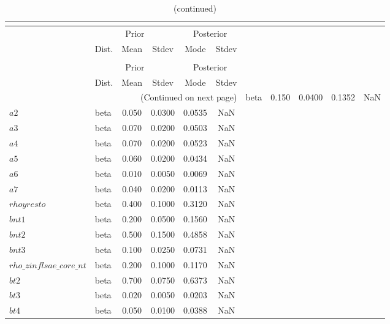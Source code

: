  
\begin{center}
\begin{longtable}{llcccc} 
\caption{Results from posterior maximization (parameters)}\\
 \label{Table:Posterior:1}\\
\toprule 
  & \multicolumn{3}{c}{Prior}  &  \multicolumn{2}{c}{Posterior} \\
  \cmidrule(r{.75em}){2-4} \cmidrule(r{.75em}){5-6}
  & Dist. & Mean  & Stdev & Mode & Stdev \\ 
\midrule \endfirsthead 
\caption{(continued)}\\
 \bottomrule 
  & \multicolumn{3}{c}{Prior}  &  \multicolumn{2}{c}{Posterior} \\
  \cmidrule(r{.75em}){2-4} \cmidrule(r{.75em}){5-6}
  & Dist. & Mean  & Stdev & Mode & Stdev \\ 
\midrule \endhead 
\bottomrule \multicolumn{6}{r}{(Continued on next page)}\endfoot 
\bottomrule\endlastfoot 
$a1$ & beta &   0.150 & 0.0400 &   0.1352 &     NaN \\ 
$a2$ & beta &   0.050 & 0.0300 &   0.0535 &     NaN \\ 
$a3$ & beta &   0.070 & 0.0200 &   0.0503 &     NaN \\ 
$a4$ & beta &   0.070 & 0.0200 &   0.0523 &     NaN \\ 
$a5$ & beta &   0.060 & 0.0200 &   0.0434 &     NaN \\ 
$a6$ & beta &   0.010 & 0.0050 &   0.0069 &     NaN \\ 
$a7$ & beta &   0.040 & 0.0200 &   0.0113 &     NaN \\ 
$rhoyresto$ & beta &   0.400 & 0.1000 &   0.3120 &     NaN \\ 
$bnt1$ & beta &   0.200 & 0.0500 &   0.1560 &     NaN \\ 
$bnt2$ & beta &   0.500 & 0.1500 &   0.4858 &     NaN \\ 
$bnt3$ & beta &   0.100 & 0.0250 &   0.0731 &     NaN \\ 
$rho\_zinflsae\_core\_nt$ & beta &   0.200 & 0.1000 &   0.1170 &     NaN \\ 
$bt2$ & beta &   0.700 & 0.0750 &   0.6373 &     NaN \\ 
$bt3$ & beta &   0.020 & 0.0050 &   0.0203 &     NaN \\ 
$bt4$ & beta &   0.050 & 0.0100 &   0.0388 &     NaN \\ 

\end{longtable}
\end{center}
